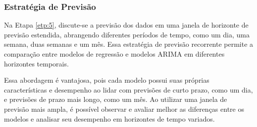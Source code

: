 \subsubsection{Estrat\'egia de Previs\~ao}\label{subsubsec:est}

Na Etapa \ref{etp:5}, discute-se a previsão dos dados em uma janela de horizonte de previsão estendida, abrangendo diferentes períodos de tempo, como um dia, uma semana, duas semanas e um mês. Essa estratégia de previsão recorrente permite a comparação entre modelos de regressão e modelos ARIMA em diferentes horizontes temporais.

Essa abordagem é vantajosa, pois cada modelo possui suas próprias características e desempenho ao lidar com previsões de curto prazo, como um dia, e previsões de prazo mais longo, como um mês. Ao utilizar uma janela de previsão mais ampla, é possível observar e avaliar melhor as diferenças entre os modelos e analisar seu desempenho em horizontes de tempo variados.